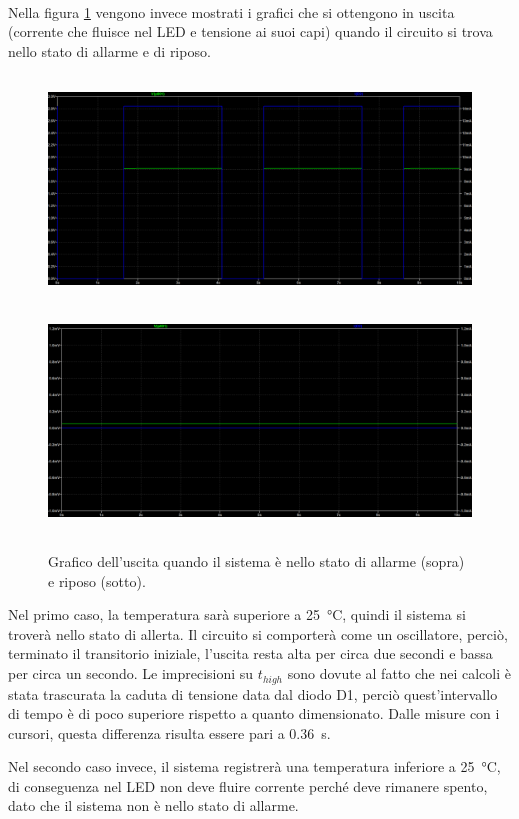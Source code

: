 \documentclass{report}
\begin{document}
\\Nella figura \ref{figura:555out} vengono invece mostrati i grafici che si ottengono in uscita (corrente che fluisce nel LED e tensione ai suoi capi) quando il circuito si trova nello stato di allarme e di riposo. \par
\begin{figure}[h!]
	\centering
	\includegraphics[height=6cm]{immagini/555on}
	\includegraphics[height=6cm]{immagini/555off}
	\caption{Grafico dell'uscita quando il sistema è nello stato di allarme (sopra) e riposo (sotto).} 
	\label{figura:555out}
\end{figure}
Nel primo caso, la temperatura sarà superiore a \SI{25}{\celsius}, quindi il sistema si troverà nello stato di allerta. Il circuito si comporterà come un oscillatore, perciò, terminato il transitorio iniziale, l'uscita resta alta per circa due secondi e bassa per circa un secondo. Le imprecisioni su $t_{high}$ sono dovute al fatto che nei calcoli è stata trascurata la caduta di tensione data dal diodo D1, perciò quest'intervallo di tempo è di poco superiore rispetto a quanto dimensionato. Dalle misure con i cursori, questa differenza risulta essere pari a \SI{0.36}{\second}. \par
Nel secondo caso invece, il sistema registrerà una temperatura inferiore a \SI{25}{\celsius}, di conseguenza nel LED non deve fluire corrente perché deve rimanere spento, dato che il sistema non è nello stato di allarme.
\end{document}

